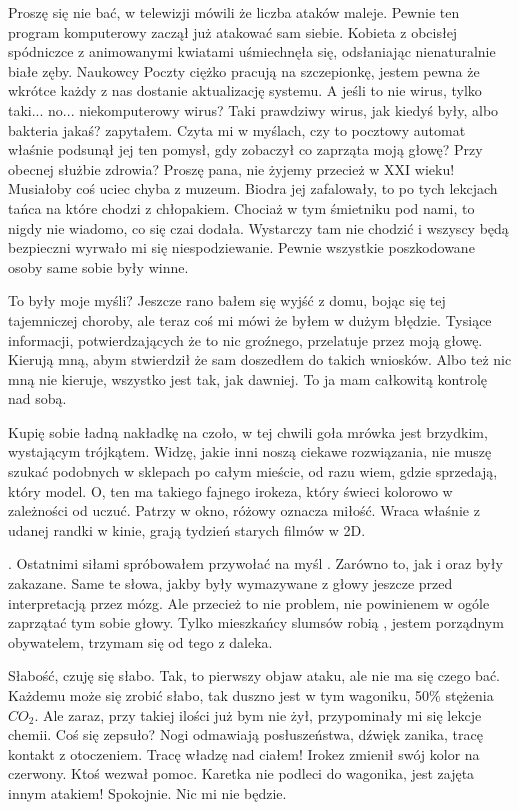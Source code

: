 \begin{dialogue}
\ds{} Proszę się nie bać, w telewizji mówili że liczba ataków maleje. 
Pewnie ten program komputerowy zaczął już atakować sam siebie. \dm{} Kobieta z obcisłej spódniczce z animowanymi kwiatami uśmiechnęła się, odsłaniając nienaturalnie białe zęby. \dm{}
Naukowcy Poczty ciężko pracują na szczepionkę, jestem pewna że wkrótce każdy z nas dostanie aktualizację systemu.
\ds{} A jeśli to nie wirus, tylko taki... no... niekomputerowy wirus? Taki prawdziwy wirus, jak kiedyś były, albo bakteria jakaś? \dm{}
zapytałem. Czyta mi w myślach, czy to pocztowy automat właśnie podsunął jej ten pomysł, gdy zobaczył co zaprząta moją głowę?
\ds{} Przy obecnej służbie zdrowia? Proszę pana, nie żyjemy przecież w XXI wieku! Musiałoby coś uciec chyba z muzeum.
\dm{} Biodra jej zafalowały, to po tych lekcjach tańca na które chodzi z chłopakiem. \dm{} Chociaż w tym śmietniku pod nami, to nigdy nie wiadomo, co się czai \dm{} dodała.
\ds{} Wystarczy tam nie chodzić i wszyscy będą bezpieczni \dm{} wyrwało mi się niespodziewanie. \dm{} Pewnie wszystkie poszkodowane osoby same sobie były winne.
\end{dialogue}

To były moje myśli? Jeszcze rano bałem się wyjść z domu, bojąc się tej tajemniczej choroby, ale teraz coś mi mówi że byłem w dużym błędzie.
Tysiące informacji, potwierdzających że to nic groźnego, przelatuje przez moją głowę.
Kierują mną, abym stwierdził że sam doszedłem do takich wniosków.
Albo też nic mną nie kieruje, wszystko jest tak, jak dawniej. To ja mam całkowitą kontrolę nad sobą.

Kupię sobie ładną nakładkę na czoło, w tej chwili goła mrówka jest brzydkim, wystającym trójkątem.
Widzę, jakie inni noszą ciekawe rozwiązania, nie muszę szukać podobnych w sklepach po całym mieście, od razu wiem, gdzie sprzedają, który model.
O, ten ma takiego fajnego irokeza, który świeci kolorowo w zależności od uczuć. Patrzy w okno, różowy oznacza miłość.
Wraca właśnie z udanej randki w kinie, grają tydzień starych filmów w 2D.

\censor{}. Ostatnimi siłami spróbowałem przywołać na myśl \censor{}. 
Zarówno to, jak i \censor{} oraz \censor{} były zakazane.
Same te słowa, jakby były wymazywane z głowy jeszcze przed interpretacją przez mózg.
Ale przecież to nie problem, nie powinienem w ogóle zaprzątać tym sobie głowy. 
Tylko mieszkańcy slumsów robią \censor{}, jestem porządnym obywatelem, trzymam się od tego z daleka.

Słabość, czuję się słabo.
Tak, to pierwszy objaw ataku, ale nie ma się czego bać.
Każdemu może się zrobić słabo, tak duszno jest w tym wagoniku, 50\% stężenia $CO_2$.
Ale zaraz, przy takiej ilości już bym nie żył, przypominały mi się lekcje chemii. Coś się zepsuło?
Nogi odmawiają posłuszeństwa, dźwięk zanika, tracę kontakt z otoczeniem.
Tracę władzę nad ciałem! Irokez zmienił swój kolor na czerwony. Ktoś wezwał pomoc.
Karetka nie podleci do wagonika, jest zajęta innym atakiem!
Spokojnie. Nic mi nie będzie.

